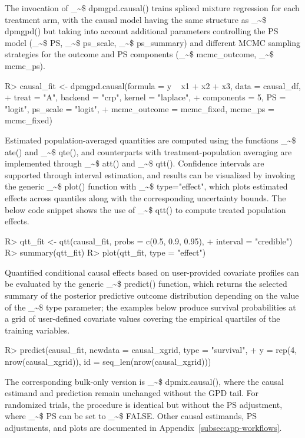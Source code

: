 \documentclass[preprint,12pt,authoryear]{elsarticle}
\makeatletter
\newcommand\code{\bgroup\@makeother\_\@makeother\~\@makeother\$\@codex}
\def\@codex#1{{\normalfont\ttfamily\hyphenchar\font=-1 #1}\egroup}
\renewenvironment{Schunk}{\vspace{0pt}}{\vspace{-0.1\baselineskip}}
\makeatother
\begin{document}
The invocation of \code{dpmgpd.causal()} trains spliced mixture
regression for each treatment arm, with the causal model having the
same structure as \code{dpmgpd()} but taking into account additional
parameters controlling the PS model (\code{PS}, \code{ps\_scale},
\code{ps\_summary}) and different MCMC sampling strategies for the
outcome and PS components (\code{mcmc\_outcome}, \code{mcmc\_ps}).

\begin{Schunk}
\begin{Sinput}
R> causal_fit <- dpmgpd.causal(formula = y ~ x1 + x2 + x3, data = causal_df,
+                treat = "A",  backend = "crp", kernel = "laplace",
+                components = 5, PS = "logit", ps_scale = "logit",
+                mcmc_outcome = mcmc_fixed, mcmc_ps = mcmc_fixed)
\end{Sinput}
\end{Schunk}

Estimated population-averaged quantities are computed using the
functions \code{ate()} and \code{qte()}, and counterparts with
treatment-population averaging are implemented through \code{att()}
and \code{qtt()}. Confidence intervals are supported through
interval estimation, and results can be visualized by invoking the
generic \code{plot()} function with \code{type="effect"}, which
plots estimated effects across quantiles along with the corresponding
uncertainty bounds. The below code snippet shows the use of
\code{qtt()} to compute treated population effects.

\begin{Schunk}
\begin{Sinput}
R> qtt_fit <- qtt(causal_fit, probs = c(0.5, 0.9, 0.95),
+                interval = "credible")
R> summary(qtt_fit)
R> plot(qtt_fit, type = "effect")
\end{Sinput}
\end{Schunk}

Quantified conditional causal effects based on user-provided
covariate profiles can be evaluated by the generic
\code{predict()} function, which returns the selected summary of the
posterior predictive outcome distribution depending on the value of the \code{type}
parameter; the examples below produce survival probabilities at a
grid of user-defined covariate values covering the empirical quartiles
of the training variables.



\begin{Schunk}
\begin{Sinput}
R> predict(causal_fit, newdata = causal_xgrid,  type = "survival",
+          y = rep(4, nrow(causal_xgrid)), id = seq_len(nrow(causal_xgrid)))
\end{Sinput}
\end{Schunk}
The corresponding bulk-only version is \code{dpmix.causal()},
where the causal estimand and prediction remain unchanged without
the GPD tail. For randomized trials, the procedure is identical but
without the PS adjustment, where \code{PS} can be set to \code{FALSE}.
Other causal estimands, PS adjustments, and plots are documented in
Appendix~\ref{subsec:app-workflows}.
\end{document}
